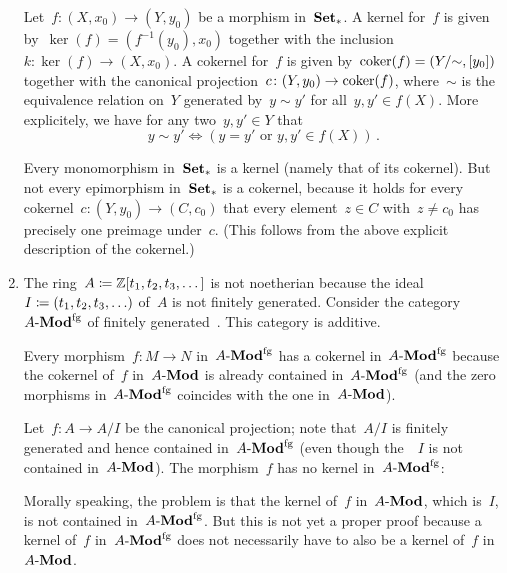 \begin{example}
\begin{enumerate}
      Let~$f \colon (X,x_0) \to (Y,y_0)$ be a morphism in~$\mathbf{Set}_*$.
      A kernel for~$f$ is given by~$\ker(f) = (f^{-1}(y_0), x_0)$ together with the inclusion~$k \colon \ker(f) \to (X,x_0)$.
      A cokernel for~$f$ is given by~$\operatorname{coker}(f) = (Y/{\sim}, [y_0])$ together with the canonical projection~$c \colon (Y, y_0) \to \operatorname{coker}(f)$, where~$\sim$ is the equivalence relation on~$Y$ generated by~$y \sim y'$ for all~$y, y' \in f(X)$.
      More explicitely, we have for any two~$y, y' \in Y$ that
      \[
              y \sim y'
        \iff (\text{$y = y'$ or~$y, y' \in f(X)$}) \,.
      \]
      
      Every monomorphism in~$\mathbf{Set}_*$ is a kernel (namely that of its cokernel).
      But not every epimorphism in~$\mathbf{Set}_*$ is a cokernel, because it holds for every cokernel~$c \colon (Y,y_0) \to (C,c_0)$ that every element~$z \in C$ with~$z \neq c_0$ has precisely one preimage under~$c$.
      (This follows from the above explicit description of the cokernel.)
    \item
      The ring~$A \coloneqq \mathbb{Z}[t_1, t_2, t_3, \dotsc]$ is not noetherian because the ideal~$I \defined \genideal{t_1, t_2, t_3, \dotsc}$ of~$A$ is not finitely generated.
      Consider the category~$\text{$A$-$\mathbf{Mod}^{\mathrm{fg}}$}$ of finitely generated~{}.
      This category is additive.
      
      Every morphism~$f \colon M \to N$ in~$\text{$A$-$\mathbf{Mod}^{\mathrm{fg}}$}$ has a cokernel in~$\text{$A$-$\mathbf{Mod}^{\mathrm{fg}}$}$ because the cokernel of~$f$ in~$\text{$A$-$\mathbf{Mod}$}$ is already contained in~$\text{$A$-$\mathbf{Mod}^{\mathrm{fg}}$}$ (and the zero morphisms in~$\text{$A$-$\mathbf{Mod}^{\mathrm{fg}}$}$ coincides with the one in~$\text{$A$-$\mathbf{Mod}$}$).
      
      Let~$f \colon A \to A/I$ be the canonical projection;
      note that~$A/I$ is finitely generated and hence contained in~$\text{$A$-$\mathbf{Mod}^{\mathrm{fg}}$}$ (even though the~{}~$I$ is not contained in~$\text{$A$-$\mathbf{Mod}$}$).
      The morphism~$f$ has no kernel in~$\text{$A$-$\mathbf{Mod}$}^{\mathrm{fg}}$:
      
      Morally speaking, the problem is that the kernel of~$f$ in~$\text{$A$-$\mathbf{Mod}$}$, which is~$I$, is not contained in~$\text{$A$-$\mathbf{Mod}^{\mathrm{fg}}$}$.
      But this is not yet a proper proof because a kernel of~$f$ in~$\text{$A$-$\mathbf{Mod}^{\mathrm{fg}}$}$ does not necessarily have to also be a kernel of~$f$ in~$\text{$A$-$\mathbf{Mod}$}$.
      

\end{enumerate}
\end{example}
